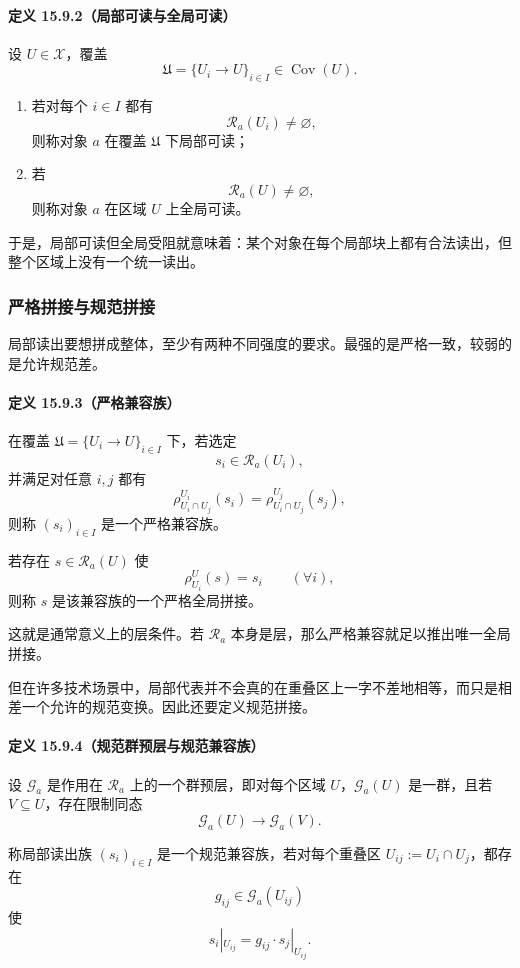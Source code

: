 \paragraph{定义 15.9.2（局部可读与全局可读）}
设 \(U\in\mathcal X\)，覆盖
\[
\mathfrak U=\{U_i\to U\}_{i\in I}\in \operatorname{Cov}(U).
\]
\begin{enumerate}
  \item 若对每个 \(i\in I\) 都有
  \[
  \mathscr R_a(U_i)\neq\varnothing,
  \]
  则称对象 \(a\) 在覆盖 \(\mathfrak U\) 下局部可读；
  \item 若
  \[
  \mathscr R_a(U)\neq\varnothing,
  \]
  则称对象 \(a\) 在区域 \(U\) 上全局可读。
\end{enumerate}
于是，局部可读但全局受阻就意味着：某个对象在每个局部块上都有合法读出，但整个区域上没有一个统一读出。

\subsubsection{严格拼接与规范拼接}

局部读出要想拼成整体，至少有两种不同强度的要求。最强的是严格一致，较弱的是允许规范差。

\paragraph{定义 15.9.3（严格兼容族）}
在覆盖 \(\mathfrak U=\{U_i\to U\}_{i\in I}\) 下，若选定
\[
s_i\in \mathscr R_a(U_i),
\]
并满足对任意 \(i,j\) 都有
\[
\rho^{U_i}_{U_i\cap U_j}(s_i)=\rho^{U_j}_{U_i\cap U_j}(s_j),
\]
则称 \((s_i)_{i\in I}\) 是一个严格兼容族。

若存在 \(s\in \mathscr R_a(U)\) 使
\[
\rho^U_{U_i}(s)=s_i\qquad(\forall i),
\]
则称 \(s\) 是该兼容族的一个严格全局拼接。

这就是通常意义上的层条件。若 \(\mathscr R_a\) 本身是层，那么严格兼容就足以推出唯一全局拼接。

但在许多技术场景中，局部代表并不会真的在重叠区上一字不差地相等，而只是相差一个允许的规范变换。因此还要定义规范拼接。

\paragraph{定义 15.9.4（规范群预层与规范兼容族）}
设 \(\mathscr G_a\) 是作用在 \(\mathscr R_a\) 上的一个群预层，即对每个区域 \(U\)，\(\mathscr G_a(U)\) 是一群，且若 \(V\subseteq U\)，存在限制同态
\[
\mathscr G_a(U)\to \mathscr G_a(V).
\]

称局部读出族 \((s_i)_{i\in I}\) 是一个规范兼容族，若对每个重叠区 \(U_{ij}:=U_i\cap U_j\)，都存在
\[
g_{ij}\in \mathscr G_a(U_{ij})
\]
使
\[
s_i|_{U_{ij}}=g_{ij}\cdot s_j|_{U_{ij}}.
\]

